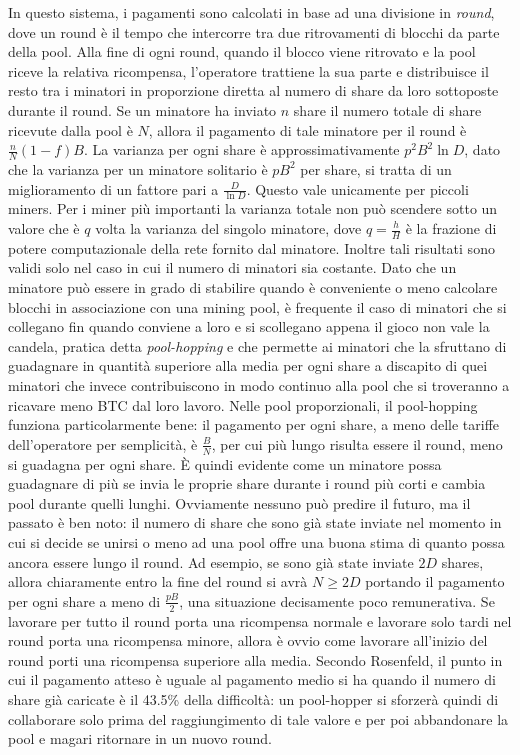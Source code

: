 In questo sistema, i pagamenti sono calcolati in base ad una divisione in \emph{round}, dove un round è il tempo che intercorre tra due ritrovamenti di blocchi da parte della pool. Alla fine di ogni round, quando il blocco viene ritrovato e la pool riceve la relativa ricompensa, l'operatore trattiene la sua parte e distribuisce il resto tra i minatori in proporzione diretta al numero di share da loro sottoposte durante il round. Se un minatore ha inviato $n$ share il numero totale di share ricevute dalla pool è $N$, allora il pagamento di tale minatore per il round è $\frac{n}{N}(1-f)B$.
La varianza per ogni share è approssimativamente $p^2 B^2 \ln{D}$, dato che la varianza per un minatore solitario è $pB^2$ per share, si tratta di un miglioramento di un fattore pari a $\frac{D}{\ln{D}}$. Questo vale unicamente per piccoli miners. Per i miner più importanti la varianza totale non può scendere sotto un valore che è $q$ volta la varianza del singolo minatore, dove $q=\frac{h}{H}$ è la frazione di potere computazionale della rete fornito dal minatore.
Inoltre tali risultati sono validi solo nel caso in cui il numero di minatori sia costante. Dato che un minatore può essere in grado di stabilire quando è conveniente o meno calcolare blocchi in associazione con una mining pool, è frequente il caso di minatori che si collegano fin quando conviene a loro e si scollegano appena il gioco non vale la candela, pratica detta \emph{pool-hopping} e che permette ai minatori che la sfruttano di guadagnare in quantità superiore alla media per ogni share a discapito di quei minatori che invece contribuiscono in modo continuo alla pool che si troveranno a ricavare meno BTC dal loro lavoro.
Nelle pool proporzionali, il pool-hopping funziona particolarmente bene: il pagamento per ogni share, a meno delle tariffe dell'operatore per semplicità, è $\frac{B}{N}$, per cui più lungo risulta essere il round, meno si guadagna per ogni share. È quindi evidente come un minatore possa guadagnare di più se invia le proprie share durante i round più corti e cambia pool durante quelli lunghi.
Ovviamente nessuno può predire il futuro, ma il passato è ben noto: il numero di share che sono già state inviate nel momento in cui si decide se unirsi o meno ad una pool offre una buona stima di quanto possa ancora essere lungo il round. Ad esempio, se sono già state inviate $2D$ shares, allora chiaramente entro la fine del round si avrà $N \geq 2D$ portando il pagamento per ogni share a meno di $\frac{pB}{2}$, una situazione decisamente poco remunerativa.
Se lavorare per tutto il round porta una ricompensa normale e lavorare solo tardi nel round porta una ricompensa minore, allora è ovvio come lavorare all'inizio del round porti una ricompensa superiore alla media. Secondo Rosenfeld, il punto in cui il pagamento atteso è uguale al pagamento medio si ha quando il numero di share già caricate è il 43.5\% della difficoltà: un pool-hopper si sforzerà quindi di collaborare solo prima del raggiungimento di tale valore e per poi abbandonare la pool e magari ritornare in un nuovo round.

